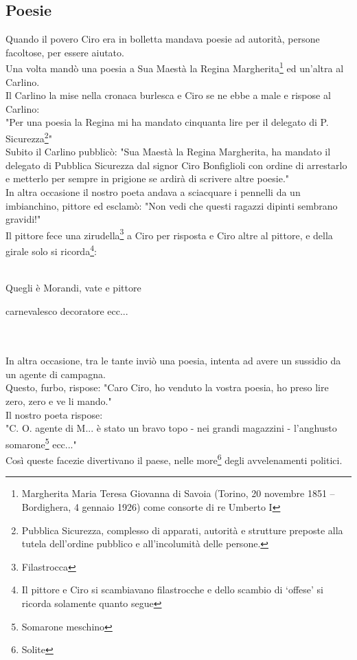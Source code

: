 \subsection{Poesie}
Quando il povero Ciro era in bolletta mandava poesie ad autorità, persone facoltose, per essere aiutato.\\
Una volta mandò una poesia a Sua Maestà la Regina Margherita\footnote{Margherita Maria Teresa Giovanna di Savoia (Torino, 20 novembre 1851 – Bordighera, 4 gennaio 1926) come consorte di re Umberto I} ed un'altra al Carlino.\\
Il Carlino la mise nella cronaca burlesca e Ciro se ne ebbe a male e rispose al Carlino:\\
"Per una poesia la Regina mi ha mandato cinquanta lire per il delegato di P. Sicurezza\footnote{Pubblica Sicurezza, complesso di apparati, autorità e strutture preposte alla tutela dell'ordine pubblico e all'incolumità delle persone.}"\\
Subito il Carlino pubblicò: "Sua Maestà la Regina Margherita, ha mandato il delegato di Pubblica Sicurezza dal signor Ciro Bonfiglioli con ordine di arrestarlo e metterlo per sempre in prigione se ardirà di scrivere altre poesie."\\
In altra occasione il nostro poeta andava a sciacquare i pennelli da un imbianchino, pittore ed esclamò: "Non vedi che questi ragazzi dipinti sembrano gravidi!"\\
Il pittore fece una zirudella\footnote{Filastrocca} a Ciro per risposta e Ciro altre al pittore, e della girale solo si ricorda\footnote{Il pittore e Ciro si scambiavano filastrocche e dello scambio di ‘offese' si ricorda solamente quanto segue}:\\\\
\textcal \Huge
	\centerline{Quegli è Morandi, vate e pittore}
	\centerline{carnevalesco decoratore ecc...} 
\normalfont \normalsize
\\\\
In altra occasione, tra le tante inviò una poesia, intenta ad avere un sussidio da un agente di campagna. \\
Questo, furbo, rispose: "Caro Ciro, ho venduto la vostra poesia, ho preso lire zero, zero e ve li mando."\\
Il nostro poeta rispose:\\
"C. O. agente di M... è stato un bravo topo - nei grandi magazzini - l'anghusto somarone\footnote{Somarone meschino} ecc..."\\
Così queste facezie divertivano il paese, nelle more\footnote{Solite} degli avvelenamenti politici. 

